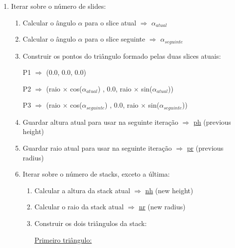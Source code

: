\documentclass[a4paper]{article}
\begin{document}
\ttfamily
\begin{enumerate}
  \item Iterar sobre o número de slides:
  \begin{enumerate}
    \item Calcular o ângulo $\alpha$ para o slice atual $\Rightarrow$ \underline{$\alpha_{atual}$}
    \item Calcular o ângulo $\alpha$ para o slice seguinte $\Rightarrow$ \underline{$\alpha_{seguinte}$}
    \item Construir os pontos do triângulo formado pelas duas slices atuais:

    \vspace{0.2cm}

        \hspace{3cm} P1 $\Rightarrow$ (0.0, 0.0, 0.0)

    \vspace{0.2cm}

        \hspace{1cm} P2 $\Rightarrow$ (raio $\times$ cos($\alpha_{atual}$) , 0.0, raio $\times$ sin($\alpha_{atual}$))

    \vspace{0.2cm}

        \hspace{0.5cm} P3 $\Rightarrow$ (raio $\times$ cos($\alpha_{seguinte}$) , 0.0, raio $\times$ sin($\alpha_{seguinte}$))

    \vspace{0.3cm}

    \item Guardar altura atual para usar na seguinte iteração $\Rightarrow$ \underline{ph} (previous height)
    \item Guardar raio atual para usar na seguinte iteração $\Rightarrow$ \underline{pr} (previous radius)

    \item Iterar sobre o número de stacks, exceto a última:
    \begin{enumerate}
      \item Calcular a altura da stack atual $\Rightarrow$ \underline{nh} (new height)
      \item Calcular o raio da stack atual $\Rightarrow$ \underline{nr} (new radius)
      \item Construir os dois triângulos da stack:

      \vspace{0.5cm}

      \underline{Primeiro triângulo:}


\end{enumerate}
\end{enumerate}
\end{enumerate}
\end{document}
